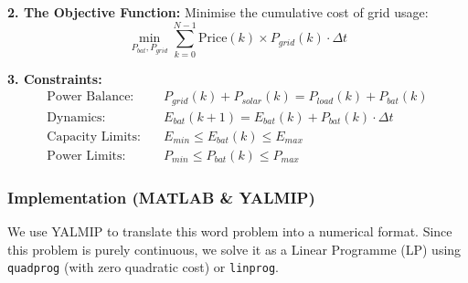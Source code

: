 \textbf{2. The Objective Function:}
Minimise the cumulative cost of grid usage:
\begin{equation}
	\min_{P_{bat}, P_{grid}} \sum_{k=0}^{N-1} \text{Price}(k) \times P_{grid}(k) \cdot \Delta t
\end{equation}

\textbf{3. Constraints:}
\begin{align}
	\text{Power Balance:} \quad & P_{grid}(k) + P_{solar}(k) = P_{load}(k) + P_{bat}(k) \\
	\text{Dynamics:} \quad & E_{bat}(k+1) = E_{bat}(k) + P_{bat}(k) \cdot \Delta t \\
	\text{Capacity Limits:} \quad & E_{min} \leq E_{bat}(k) \leq E_{max} \\
	\text{Power Limits:} \quad & P_{min} \leq P_{bat}(k) \leq P_{max}
\end{align}

\subsubsection{Implementation (MATLAB \& YALMIP)}
We use YALMIP to translate this word problem into a numerical format. Since this problem is purely continuous, we solve it as a Linear Programme (LP) using \texttt{quadprog} (with zero quadratic cost) or \texttt{linprog}.

